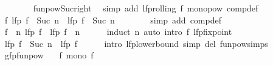 \begin{isabellebody}
\ \ \ \ \ \ \isamarkupfalse%
\ funpow{\isacharunderscore}{\kern0pt}Suc{\isacharunderscore}{\kern0pt}right\ \isamarkupfalse%
\ {\isacharparenleft}{\kern0pt}simp\ add{\isacharcolon}{\kern0pt}\ lfp{\isacharunderscore}{\kern0pt}rolling\ f\ mono{\isacharunderscore}{\kern0pt}pow\ comp{\isacharunderscore}{\kern0pt}def{\isacharparenright}{\kern0pt}\isanewline
\ \ \ \ \isamarkupfalse%
\ \isamarkupfalse%
\ {\isachardoublequoteopen}f\ {\isacharparenleft}{\kern0pt}lfp\ {\isacharparenleft}{\kern0pt}f\ {\isacharcircum}{\kern0pt}{\isacharcircum}{\kern0pt}\ Suc\ n{\isacharparenright}{\kern0pt}{\isacharparenright}{\kern0pt}\ {\isasymle}\ lfp\ {\isacharparenleft}{\kern0pt}f\ {\isacharcircum}{\kern0pt}{\isacharcircum}{\kern0pt}\ Suc\ n{\isacharparenright}{\kern0pt}{\isachardoublequoteclose}\isanewline
\ \ \ \ \ \ \isamarkupfalse%
\ {\isacharparenleft}{\kern0pt}simp\ add{\isacharcolon}{\kern0pt}\ comp{\isacharunderscore}{\kern0pt}def{\isacharparenright}{\kern0pt}\isanewline
\ \ \isamarkupfalse%
\isanewline
\ \ \isamarkupfalse%
\ {\isachardoublequoteopen}{\isacharparenleft}{\kern0pt}f\ {\isacharcircum}{\kern0pt}{\isacharcircum}{\kern0pt}\ n{\isacharparenright}{\kern0pt}\ {\isacharparenleft}{\kern0pt}lfp\ f{\isacharparenright}{\kern0pt}\ {\isacharequal}{\kern0pt}\ lfp\ f{\isachardoublequoteclose}\ \ n\isanewline
\ \ \ \ \isamarkupfalse%
\ {\isacharparenleft}{\kern0pt}induct\ n{\isacharparenright}{\kern0pt}\ {\isacharparenleft}{\kern0pt}auto\ intro{\isacharcolon}{\kern0pt}\ f\ lfp{\isacharunderscore}{\kern0pt}fixpoint{\isacharparenright}{\kern0pt}\isanewline
\ \ \isamarkupfalse%
\ \isamarkupfalse%
\ {\isachardoublequoteopen}lfp\ {\isacharparenleft}{\kern0pt}f\ {\isacharcircum}{\kern0pt}{\isacharcircum}{\kern0pt}\ Suc\ n{\isacharparenright}{\kern0pt}\ {\isasymle}\ lfp\ f{\isachardoublequoteclose}\isanewline
\ \ \ \ \isamarkupfalse%
\ {\isacharparenleft}{\kern0pt}intro\ lfp{\isacharunderscore}{\kern0pt}lowerbound{\isacharparenright}{\kern0pt}\ {\isacharparenleft}{\kern0pt}simp\ del{\isacharcolon}{\kern0pt}\ funpow{\isachardot}{\kern0pt}simps{\isacharparenright}{\kern0pt}\isanewline
{}\isamarkupfalse%
%
\endisatagproof
{\isafoldproof}%
%
\isadelimproof
\isanewline
%
\endisadelimproof
\isanewline
{}\isamarkupfalse%
\ gfp{\isacharunderscore}{\kern0pt}funpow{\isacharcolon}{\kern0pt}\isanewline
\ \ \ f{\isacharcolon}{\kern0pt}\ {\isachardoublequoteopen}mono\ f{\isachardoublequoteclose}\isanewline

\end{isabellebody}
